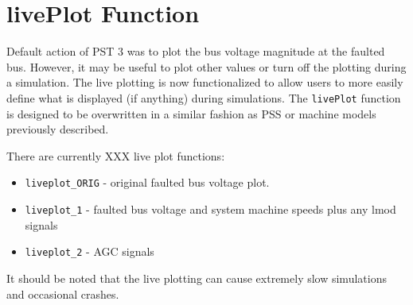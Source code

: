 \section{livePlot Function} 
Default action of PST 3 was to plot the bus voltage magnitude at the faulted bus.
However, it may be useful to plot other values or turn off the plotting during a simulation.
The live plotting is now functionalized to allow users to more easily define what is displayed (if anything) during simulations.
The \verb|livePlot| function is designed to be overwritten in a similar fashion as PSS or machine models previously described.

There are currently XXX live plot functions:

\begin{itemize}
\item \verb|liveplot_ORIG| - original faulted bus voltage plot.
\item \verb|liveplot_1| - faulted bus voltage and system machine speeds plus any lmod signals
\item \verb|liveplot_2| - AGC signals
\end{itemize}

It should be noted that the live plotting can cause extremely slow simulations and occasional crashes.